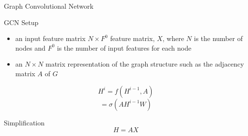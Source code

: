 \begin{frame}[t]{Graph Convolutional Network}
    \begin{block}{GCN Setup}
        \begin{itemize}
            \item an input feature matrix $N\times F^0$ feature matrix, $X$, where $N$ is the number of nodes and $F^0$ is the number of input features for each node
            \item an $N\times N$ matrix representation of the graph structure such as the adjacency matrix $A$ of $G$
        \end{itemize}
    \end{block}

    $$ H^i = f(H^{i-1}, A) $$
    $$ = \sigma(AH^{i-1}W)$$

    \begin{block}{Simplification}
        $$ H = AX $$
    \end{block}
\end{frame}

